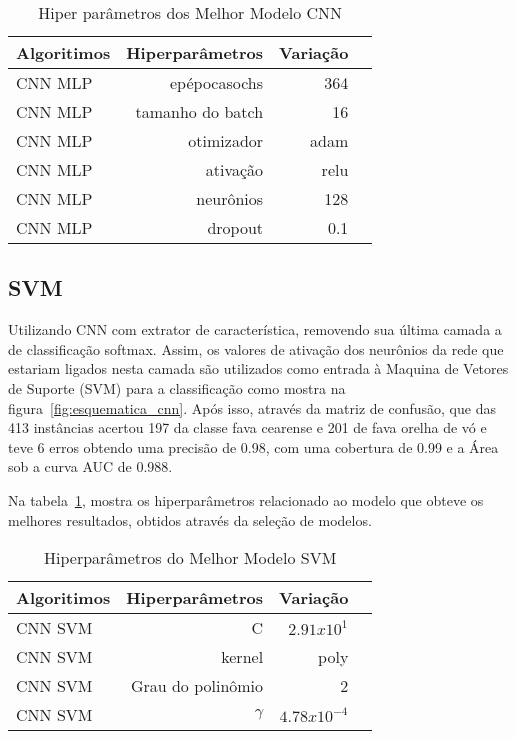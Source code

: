 \begin{table}[H]
\centering
\caption{Hiper parâmetros dos Melhor Modelo CNN }
\label{tabela:hiperparametros_best_models}
\def\arraystretch{1.2}
\begin{tabular}{@{}lrrr@{}}
\toprule
{\textbf{Algoritimos}} & {\textbf{Hiperparâmetros}} & {\textbf{Variação}}  \\
\midrule
CNN MLP & epépocasochs & 364 \\ 
CNN MLP & tamanho do batch & 16\\ 
CNN MLP & otimizador & adam \\
CNN MLP & ativação & relu \\
CNN MLP & neurônios & 128 \\
CNN MLP & dropout & 0.1 \\
\bottomrule
\end{tabular}
\end{table}

\subsection{SVM}

Utilizando CNN com extrator de característica, removendo sua última camada a de classificação softmax. Assim, os valores de ativação dos neurônios da rede que estariam ligados nesta camada são utilizados como entrada à Maquina de Vetores de Suporte (SVM) para a classificação como mostra na figura~\ref{fig:esquematica_cnn}. Após isso, através da matriz de confusão, que das 413 instâncias acertou 197 da classe fava cearense e 201 de fava orelha de vó e teve 6 erros obtendo uma precisão de 0.98, com uma cobertura de 0.99 e a Área sob a curva AUC de 0.988.


Na tabela~\ref{tabela:hiperparametros_best_models}, mostra os hiperparâmetros relacionado ao modelo que obteve os melhores resultados, obtidos através da seleção de modelos.

\begin{table}[H]
\centering
\caption{Hiperparâmetros do Melhor Modelo SVM}
\label{tabela:hiperparametros_best_models_svm}
\def\arraystretch{1.2}
\begin{tabular}{@{}lrrr@{}}
\toprule
{\textbf{Algoritimos}} & {\textbf{Hiperparâmetros}} & {\textbf{Variação}}  \\
\midrule
CNN SVM & C & $2.91x10^{1}$ \\ %
CNN SVM & kernel & poly \\ 
CNN SVM & Grau do polinômio & 2 \\ 
CNN SVM & $\gamma$  & 
 $4.78x10^{-4}$ \\
\bottomrule
\end{tabular}
\end{table}

